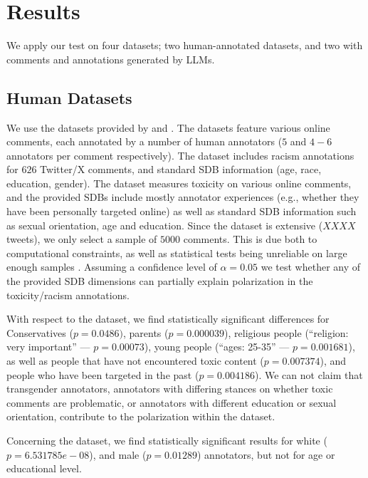 \documentclass{article}
\begin{document}
\section{Results}

We apply our test on four datasets; two human-annotated datasets, and two with comments and annotations generated by \acp{LLM}.

\subsection{Human Datasets}

We use the datasets provided by \textcite{kumar-et-al-2021} and \textcite{sap-etal-2022-annotators}. The datasets feature various online comments, each annotated by a number of human annotators ($5$ and $4-6$ annotators per comment respectively). The \textcite{sap-etal-2022-annotators} dataset includes racism annotations for $626$ Twitter/X comments, and standard \ac{SDB} information (age, race, education, gender). The \textcite{kumar-et-al-2021} dataset measures toxicity on various online comments, and the provided \acp{SDB} include mostly annotator experiences (e.g., whether they have been personally targeted online) as well as standard \ac{SDB} information such as sexual orientation, age and education. Since the dataset is extensive ($XXXX$ tweets), we only select a sample of $5000$ comments. This is due both to computational constraints, as well as statistical tests being unreliable on large enough samples \cite{trafimow2018manipulating}. Assuming a confidence level of $\alpha=0.05$ we test whether any of the provided \ac{SDB} dimensions can partially explain polarization in the toxicity/racism annotations. 

With respect to the \textcite{kumar-et-al-2021} dataset, we find statistically significant differences for Conservatives ($p=0.0486)$, parents ($p=0.000039$), religious people (``religion: very important'' --- $p = 0.00073$), young people (``ages: 25-35'' --- $p = 0.001681$), as well as people that have not encountered toxic content ($p=0.007374$), and people who have been targeted in the past ($p=0.004186$). We can not claim that transgender annotators, annotators with differing stances on whether toxic comments are problematic, or annotators with different education or sexual orientation, contribute to the polarization within the dataset.

Concerning the \textcite{sap-etal-2022-annotators} dataset, we find statistically significant results for white ($p = 6.531785e-08$), and male ($p=0.01289$) annotators, but not for age or educational level.
\end{document}
